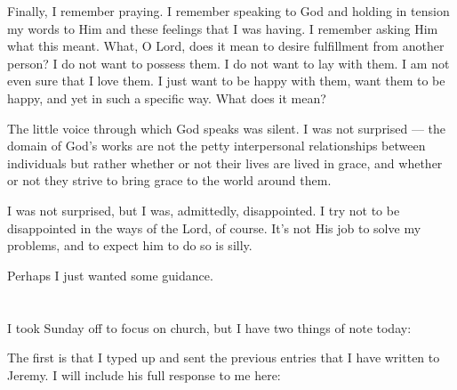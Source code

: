 Finally, I remember praying. I remember speaking to God and holding in tension my words to Him and these feelings that I was having. I remember asking Him what this meant. What, O Lord, does it mean to desire fulfillment from another person? I do not want to possess them. I do not want to lay with them. I am not even sure that I love them. I just want to be happy with them, want them to be happy, and yet in such a specific way. What does it mean?

The little voice through which God speaks was silent. I was not surprised --- the domain of God's works are not the petty interpersonal relationships between individuals but rather whether or not their lives are lived in grace, and whether or not they strive to bring grace to the world around them.

I was not surprised, but I was, admittedly, disappointed. I try not to be disappointed in the ways of the Lord, of course. It's not His job to solve my problems, and to expect him to do so is silly.

Perhaps I just wanted some guidance.

\section{}

I took Sunday off to focus on church, but I have two things of note today:

The first is that I typed up and sent the previous entries that I have written to Jeremy. I will include his full response to me here:

